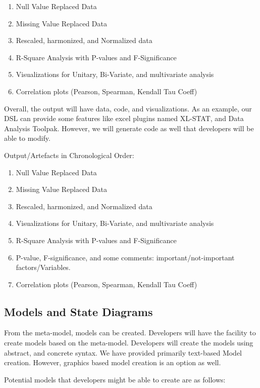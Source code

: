 \begin{enumerate}
	\item Null Value Replaced Data
	\item Missing Value Replaced Data
	\item Rescaled, harmonized, and Normalized data
	\item R-Square Analysis with P-values and F-Significance
	\item Visualizations for Unitary, Bi-Variate, and multivariate analysis
	\item Correlation plots (Pearson, Spearman, Kendall Tau Coeff)			
\end{enumerate}

\flushleft \justify Overall, the output will have data, code, and visualizations. As an example, our DSL can provide some features like excel plugins named XL-STAT, and Data Analysis Toolpak. However, we will generate code as well that developers will be able to modify.

\flushleft \justify Output/Artefacts in Chronological Order:
\begin{enumerate}
	\item Null Value Replaced Data
	\item Missing Value Replaced Data
	\item Rescaled, harmonized, and Normalized data
	\item Visualizations for Unitary, Bi-Variate, and multivariate analysis
	\item R-Square Analysis with P-values and F-Significance
	\item P-value, F-significance, and some comments: important/not-important factors/Variables.
	\item Correlation plots (Pearson, Spearman, Kendall Tau Coeff)
\end{enumerate}

\subsection {Models and State Diagrams}
\flushleft \justify From the meta-model, models can be created. Developers will have the facility to create models based on the meta-model. Developers will create the models using abstract, and concrete syntax. We have provided primarily text-based Model creation. However, graphics based model creation is an option as well.

\flushleft \justify Potential models that developers might be able to create are as follows:

